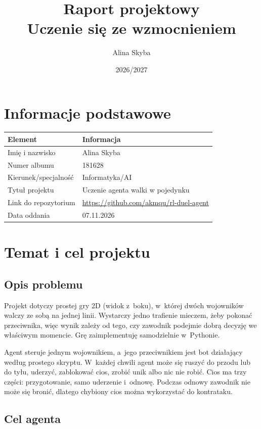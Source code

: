 \documentclass[12pt]{article}
\title{Raport projektowy\\Uczenie się ze wzmocnieniem}
\author{Alina Skyba}
\date{2026/2027}
\begin{document}
\maketitle
\tableofcontents
\newpage

\section{Informacje podstawowe}

\begin{center}
\begin{tabular}{p{}p{}}
\toprule
Element & Informacja \\
\midrule
Imię i nazwisko & Alina Skyba \\
Numer albumu & 181628 \\
Kierunek/specjalność & Informatyka/AI \\
Tytuł projektu & Uczenie agenta walki w pojedynku \\
Link do repozytorium & \url{https://github.com/akmqu/rl-duel-agent} \\
Data oddania & 07.11.2026 \\
\bottomrule
\end{tabular}
\end{center}

\section{Temat i cel projektu}

\subsection{Opis problemu}

Projekt dotyczy prostej gry 2D (widok z~boku), w~której dwóch wojowników walczy ze sobą na jednej linii. Wystarczy jedno trafienie mieczem, żeby pokonać przeciwnika, więc wynik zależy od tego, czy zawodnik podejmie dobrą decyzję we właściwym momencie. Grę zaimplementuję samodzielnie w~Pythonie.

Agent steruje jednym wojownikiem, a~jego przeciwnikiem jest bot działający według prostego skryptu. W~każdej chwili agent może się ruszyć do przodu lub do tyłu, uderzyć, zablokować cios, zrobić unik albo nic nie robić. Cios ma trzy części: przygotowanie, samo uderzenie i~odnowę. Podczas odnowy zawodnik nie może się bronić, dlatego chybiony cios można wykorzystać do kontrataku.

\subsection{Cel agenta}
\end{document}
